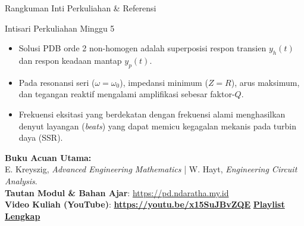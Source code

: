 \documentclass[aspectratio=169,10pt]{beamer}
\begin{document}
\begin{frame}{Rangkuman Inti Perkuliahan \& Referensi}
  \begin{exampleblock}{Intisari Perkuliahan Minggu 5}
    \begin{itemize}
      \item Solusi PDB orde 2 non-homogen adalah superposisi respon transien $y_h(t)$ dan respon keadaan mantap $y_p(t)$.
      \item Pada resonansi seri ($\omega = \omega_0$), impedansi minimum ($Z = R$), arus maksimum, dan tegangan reaktif mengalami amplifikasi sebesar faktor-$Q$.
      \item Frekuensi eksitasi yang berdekatan dengan frekuensi alami menghasilkan denyut layangan (\textit{beats}) yang dapat memicu kegagalan mekanis pada turbin daya (SSR).
    \end{itemize}
  \end{exampleblock}
  \vspace{0.2cm}
  \begin{center}
    \small \textbf{Buku Acuan Utama:} \\
    E. Kreyszig, \textit{Advanced Engineering Mathematics} | W. Hayt, \textit{Engineering Circuit Analysis}. \\
    \vspace{0.3cm}
    \textbf{Tautan Modul \& Bahan Ajar}: \url{https://pd.ndaratha.my.id} \\[0.12cm]\textbf{Video Kuliah (YouTube)}: {\color{red!85!black}\textbf{\url{https://youtu.be/x15SuJBvZQE}}} \quad \textbar \quad \href{https://www.youtube.com/playlist?list=PLS5oOZWXZeTw}{\color{unibblue}\textbf{Playlist Lengkap}}
  \end{center}
\end{frame}
\end{document}
